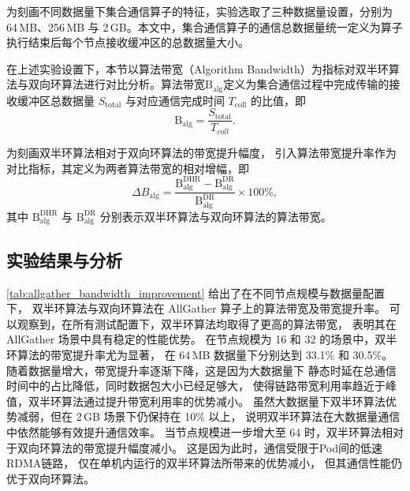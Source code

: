 为刻画不同数据量下集合通信算子的特征，实验选取了三种数据量设置，分别为 64\,MB、256\,MB 与 2\,GB。本文中，集合通信算子的通信总数据量统一定义为算子执行结束后每个节点接收缓冲区的总数据量大小。

在上述实验设置下，本节以算法带宽（Algorithm Bandwidth）为指标对双半环算法与双向环算法进行对比分析。算法带宽$\mathrm{B_{alg}}$定义为集合通信过程中完成传输的接收缓冲区总数据量 $S_{\mathrm{total}}$ 与对应通信完成时间 $T_{\mathrm{coll}}$ 的比值，即
\begin{equation}
\mathrm{B_{alg}}
=
\frac{S_{\mathrm{total}}}{T_{coll}}.
\end{equation}

为刻画双半环算法相对于双向环算法的带宽提升幅度，
引入算法带宽提升率作为对比指标，其定义为两者算法带宽的相对增幅，即
\begin{equation}
\Delta B_{\mathrm{alg}}
=
\frac{\mathrm{B_{alg}^{DHR}}-\mathrm{B_{alg}^{DR}}}
{\mathrm{B_{alg}^{DR}}}
\times 100\%,
\end{equation}
其中 $\mathrm{B_{alg}^{DHR}}$ 与 $\mathrm{B_{alg}^{DR}}$ 分别表示双半环算法与双向环算法的算法带宽。



\subsection{实验结果与分析}

\autoref{tab:allgather_bandwidth_improvement} 给出了在不同节点规模与数据量配置下，
双半环算法与双向环算法在 AllGather 算子上的算法带宽及带宽提升率。
可以观察到，在所有测试配置下，双半环算法均取得了更高的算法带宽，
表明其在 AllGather 场景中具有稳定的性能优势。
在节点规模为 16 和 32 的场景中，双半环算法的带宽提升率尤为显著，
在 64\,MB 数据量下分别达到 33.1\% 和 30.5\%。
随着数据量增大，带宽提升率逐渐下降，这是因为大数据量下
静态时延在总通信时间中的占比降低，同时数据包大小已经足够大，
使得链路带宽利用率趋近于峰值，双半环算法通过提升带宽利用率的优势减小。
虽然大数据量下双半环算法优势减弱，但在 2\,GB 场景下仍保持在 10\% 以上，
说明双半环算法在大数据量通信中依然能够有效提升通信效率。
当节点规模进一步增大至 64 时，双半环算法相对于双向环算法的带宽提升幅度减小。
这是因为此时，通信受限于Pod间的低速RDMA链路，
仅在单机内运行的双半环算法所带来的优势减小，
但其通信性能仍优于双向环算法。



